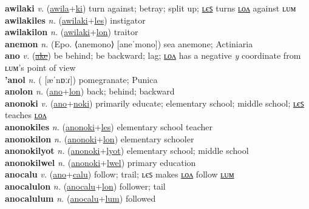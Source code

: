 \textbf{awilaki} \textit{v.} (\hyperref[awila]{awila}+\hyperref[ki]{ki})
turn against; betray; split up; \hyperref[awilakiles]{ʟєꜱ} turns \hyperref[awilakilon]{ʟᴏᴧ} against ʟᴜᴍ \label{awilaki} \\
\textbf{awilakiles} \textit{n.} (\hyperref[awilaki]{awilaki}+\hyperref[les]{les})
instigator \label{awilakiles} \\
\textbf{awilakilon} \textit{n.} (\hyperref[awilaki]{awilaki}+\hyperref[lon]{lon})
traitor \label{awilakilon} \\
\textbf{anemon} \textit{n.} (Epo. ⟨anemono⟩ [aneˈmono])
sea anemone; Actiniaria \label{anemon} \\
\textbf{ano} \textit{v.} (\hyperref[ake]{\sout{ake}})
be behind; be backward; lag; \hyperref[anolon]{ʟᴏᴧ} has a negative \textit{y} coordinate from ʟᴜᴍ’s point of view \label{ano} \\
\textbf{'anol} \textit{n.} ( [æˈnɒːɾ])
pomegranate; Punica \label{'anol} \\
\textbf{anolon} \textit{n.} (\hyperref[ano]{ano}+\hyperref[lon]{lon})
back; behind; backward \label{anolon} \\
\textbf{anonoki} \textit{v.} (\hyperref[ano]{ano}+\hyperref[noki]{noki})
primarily educate; elementary school; middle school; \hyperref[anonokiles]{ʟєꜱ} teaches \hyperref[anonokilon]{ʟᴏᴧ} \label{anonoki} \\
\textbf{anonokiles} \textit{n.} (\hyperref[anonoki]{anonoki}+\hyperref[les]{les})
elementary school teacher \label{anonokiles} \\
\textbf{anonokilon} \textit{n.} (\hyperref[anonoki]{anonoki}+\hyperref[lon]{lon})
elementary schooler \label{anonokilon} \\
\textbf{anonokilyot} \textit{n.} (\hyperref[anonoki]{anonoki}+\hyperref[lyot]{lyot})
elementary school; middle school \label{anonokilyot} \\
\textbf{anonokilwel} \textit{n.} (\hyperref[anonoki]{anonoki}+\hyperref[lwel]{lwel})
primary education \label{anonokilwel} \\
\textbf{anocalu} \textit{v.} (\hyperref[ano]{ano}+\hyperref[calu]{calu})
follow; trail; ʟєꜱ makes \hyperref[anocalulon]{ʟᴏᴧ} follow \hyperref[anocalulum]{ʟᴜᴍ} \label{anocalu} \\
\textbf{anocalulon} \textit{n.} (\hyperref[anocalu]{anocalu}+\hyperref[lon]{lon})
follower; tail \label{anocalulon} \\
\textbf{anocalulum} \textit{n.} (\hyperref[anocalu]{anocalu}+\hyperref[lum]{lum})
followed \label{anocalulum} \\
